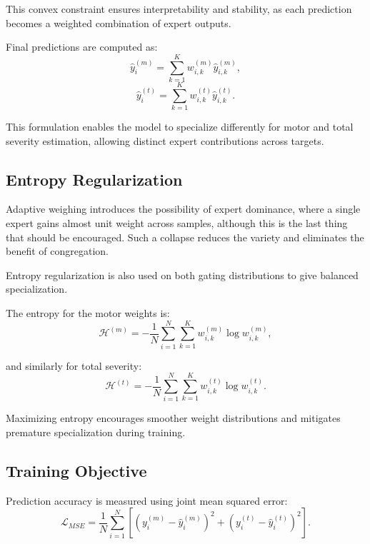 \documentclass{customIEEEsingle}
\begin{document}
	This convex constraint ensures interpretability and stability, as each prediction becomes a weighted combination of expert outputs.
	
	Final predictions are computed as:
	\begin{equation}
		\hat{y}_i^{(m)} = \sum_{k=1}^{K} w_{i,k}^{(m)} \hat{y}_{i,k}^{(m)},
	\end{equation}
	\begin{equation}
		\hat{y}_i^{(t)} = \sum_{k=1}^{K} w_{i,k}^{(t)} \hat{y}_{i,k}^{(t)}.
	\end{equation}
	
	This formulation enables the model to specialize differently for motor and total severity estimation, allowing distinct expert contributions across targets.
	
	
	\subsection{Entropy Regularization}
	
	Adaptive weighing introduces the possibility of expert dominance, where a single expert gains almost unit weight across samples, although this is the last thing that should be encouraged. Such a collapse reduces the variety and eliminates the benefit of congregation.
	
	Entropy regularization is also used on both gating distributions to give balanced specialization.
	
	The entropy for the motor weights is:
	\begin{equation}
		\mathcal{H}^{(m)} = - \frac{1}{N} 
		\sum_{i=1}^{N} \sum_{k=1}^{K} 
		w_{i,k}^{(m)} \log w_{i,k}^{(m)},
	\end{equation}
	
	and similarly for total severity:
	\begin{equation}
		\mathcal{H}^{(t)} = - \frac{1}{N} 
		\sum_{i=1}^{N} \sum_{k=1}^{K} 
		w_{i,k}^{(t)} \log w_{i,k}^{(t)}.
	\end{equation}
	
	Maximizing entropy encourages smoother weight distributions and mitigates premature specialization during training.
	
	\subsection{Training Objective}
	
	Prediction accuracy is measured using joint mean squared error:
	\begin{equation}
		\mathcal{L}_{MSE} = \frac{1}{N} 
		\sum_{i=1}^{N}
		\left[
		(y_i^{(m)} - \hat{y}_i^{(m)})^2 +
		(y_i^{(t)} - \hat{y}_i^{(t)})^2
		\right].
	\end{equation}
	
\end{document}
